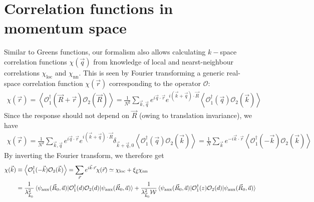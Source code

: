 \documentclass{report}
\numberwithin{equation}{section}
\begin{document}
\section{Correlation functions in momentum space}
Similar to Greens functions, our formalism also allows calculating \(k-\)space correlation functions \(\chi(\vec q)\) from knowledge of local and nearst-neighbour correlations \(\chi_\text{loc}\) and \(\chi_\text{nn}\). This is seen by Fourier transforming a generic real-space correlation function \(\chi(\vec r)\) corresponding to the operator \(\mathcal{O}\):
\begin{equation}\begin{aligned}
	\chi(\vec r) = \left<\mathcal{O}_1^\dagger (\vec R + \vec r) \mathcal{O}_2(\vec R)\right> = \frac{1}{N^2}\sum_{\vec k, \vec q} e^{i \vec q \cdot \vec r}e^{i \left(\vec k + \vec q\right) \cdot \vec R}\left<\mathcal{O}_1^\dagger (\vec q) \mathcal{O}_2(\vec k)\right>
\end{aligned}\end{equation}
Since the response should not depend on \(\vec R\) (owing to translation invariance), we have
\begin{equation}\begin{aligned}
	\chi(\vec r) = \frac{1}{N^2}\sum_{\vec k, \vec q} e^{i \vec q \cdot \vec r}e^{i \left(\vec k + \vec q\right) \cdot \vec R}\delta_{\vec k + \vec q, 0}\left<\mathcal{O}_1^\dagger (\vec q) \mathcal{O}_2(\vec k)\right> = \frac{1}{N}\sum_{\vec k} e^{-i \vec k \cdot \vec r}\left<\mathcal{O}_1^\dagger (-\vec k) \mathcal{O}_2(\vec k)\right>
\end{aligned}\end{equation}
By inverting the Fourier transform, we therefore get
\begin{equation}\begin{aligned}
	\chi(\vec k) &\equiv \left<\mathcal{O}_1^\dagger (-\vec k) \mathcal{O}_2(\vec k)\right> = \sum_{\vec r}e^{i \vec{k}\cdot\vec{r}} \chi(\vec r) \simeq \chi_\text{loc} + \xi_{\vec k} \chi_\text{nn} \\
	&= \frac{1}{\lambda_{\vec k_0}^2}\braket{\psi_\text{aux}(\vec R_0, \vec a) | \mathcal{O}_1^\dagger(d) \mathcal{O}_2(d) | \psi_\text{aux}(\vec R_0, \vec a)} + \frac{1}{\lambda_{\vec k_0}^2 \mathcal{W}}\braket{\psi_\text{aux}(\vec R_0, \vec a) | \mathcal{O}_1^\dagger(z) \mathcal{O}_2(d) | \psi_\text{aux}(\vec R_0, \vec a)}
\end{aligned}\end{equation}
\end{document}
